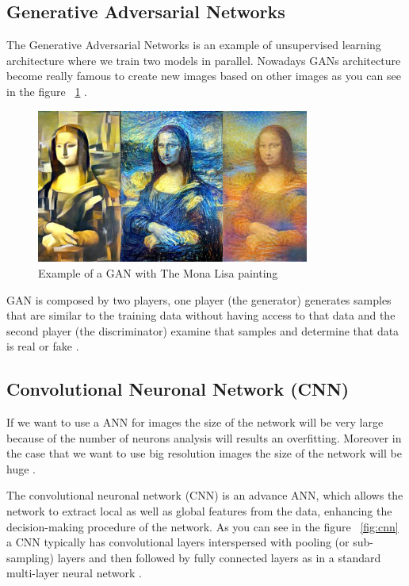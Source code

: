 \subsection[Generative Adversarial Networks]{Generative Adversarial Networks}
The Generative Adversarial Networks is an example of unsupervised learning architecture where we train two models in parallel. Nowadays GANs architecture become really famous to create new images based on other images as you can see in the figure ~\ref{fig:monalisa} \cite{dp4j-deep-learning}. 

\begin{figure}[H]
\centering
\includegraphics[width=0.8\textwidth]{./figures/monalisa}
\caption{Example of a GAN with The Mona Lisa painting \cite{can-art}}
\label{fig:monalisa}
\end{figure}

GAN is composed by two players, one player (the generator) generates samples that are similar to the training data without having access to that data and the second player (the discriminator) examine that samples and determine that data is real or fake \cite{can-art}.


\subsection[Convolutional Neuronal Network (CNN)]{Convolutional Neuronal Network (CNN)}


If we want to use a ANN for images the size of the network will be very large because of the number of neurons analysis will results an overfitting. Moreover in the case that we want to use big resolution images the size of the network will be huge \cite{rajalingappaa}.

The convolutional neuronal network (CNN) is an advance ANN, which allows the network to extract local as well as global features from the data, enhancing the decision-making procedure of the network\cite{abdullah}. As you can see in the figure ~\ref{fig:cnn} a CNN typically has convolutional layers interspersed with pooling (or sub-sampling) layers and then followed by fully connected layers as in a standard multi-layer neural network \cite{greenspan}.

